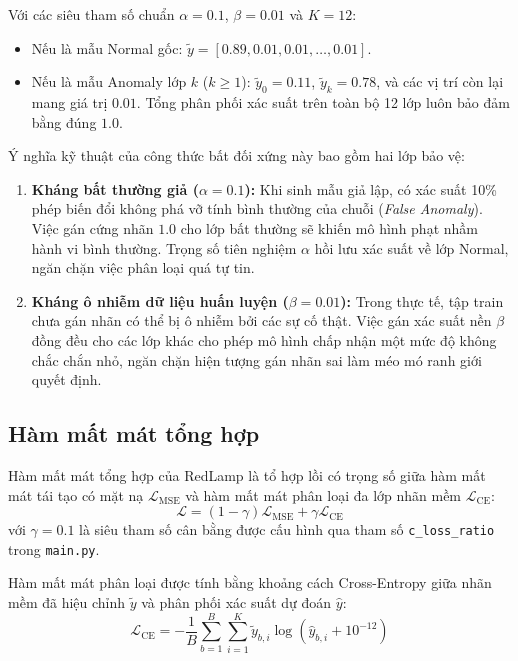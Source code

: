 \documentclass[sigconf,nonacm]{acmart}
\begin{document}
Với các siêu tham số chuẩn $\alpha = 0.1$, $\beta = 0.01$ và $K = 12$:
\begin{itemize}[leftmargin=*, itemsep=2pt, parsep=0pt]
    \item Nếu là mẫu Normal gốc: $\tilde{y} = [0.89, 0.01, 0.01, \dots, 0.01]$.
    \item Nếu là mẫu Anomaly lớp $k$ ($k \ge 1$): $\tilde{y}_0 = 0.11$, $\tilde{y}_k = 0.78$, và các vị trí còn lại mang giá trị $0.01$. Tổng phân phối xác suất trên toàn bộ 12 lớp luôn bảo đảm bằng đúng $1.0$.
\end{itemize}

Ý nghĩa kỹ thuật của công thức bất đối xứng này bao gồm hai lớp bảo vệ:
\begin{enumerate}[leftmargin=*, itemsep=1pt, parsep=0pt]
    \item \textbf{Kháng bất thường giả ($\alpha = 0.1$):} Khi sinh mẫu giả lập, có xác suất 10\% phép biến đổi không phá vỡ tính bình thường của chuỗi (\textit{False Anomaly}). Việc gán cứng nhãn $1.0$ cho lớp bất thường sẽ khiến mô hình phạt nhầm hành vi bình thường. Trọng số tiên nghiệm $\alpha$ hồi lưu xác suất về lớp Normal, ngăn chặn việc phân loại quá tự tin.
    \item \textbf{Kháng ô nhiễm dữ liệu huấn luyện ($\beta = 0.01$):} Trong thực tế, tập train chưa gán nhãn có thể bị ô nhiễm bởi các sự cố thật. Việc gán xác suất nền $\beta$ đồng đều cho các lớp khác cho phép mô hình chấp nhận một mức độ không chắc chắn nhỏ, ngăn chặn hiện tượng gán nhãn sai làm méo mó ranh giới quyết định.
\end{enumerate}

\subsection{Hàm mất mát tổng hợp}

Hàm mất mát tổng hợp của RedLamp là tổ hợp lồi có trọng số giữa hàm mất mát tái tạo có mặt nạ $\mathcal{L}_{\text{MSE}}$ và hàm mất mát phân loại đa lớp nhãn mềm $\mathcal{L}_{\text{CE}}$:
\begin{equation}
    \mathcal{L} = (1 - \gamma)\mathcal{L}_{\text{MSE}} + \gamma \mathcal{L}_{\text{CE}}
\end{equation}
với $\gamma = 0.1$ là siêu tham số cân bằng được cấu hình qua tham số \texttt{c\_loss\_ratio} trong \texttt{main.py}.

Hàm mất mát phân loại được tính bằng khoảng cách Cross-Entropy giữa nhãn mềm đã hiệu chỉnh $\tilde{y}$ và phân phối xác suất dự đoán $\hat{y}$:
\begin{equation}
    \mathcal{L}_{\text{CE}} = - \frac{1}{B} \sum_{b=1}^B \sum_{i=1}^K \tilde{y}_{b, i} \log\left(\hat{y}_{b, i} + 10^{-12}\right)
\end{equation}
\end{document}
